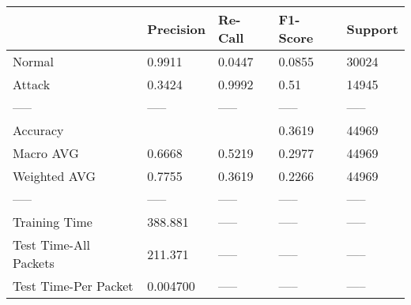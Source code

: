 \begin{tabular}{lllll}
\toprule
{} & Precision & Re-Call & F1-Score & Support \\
\midrule
Normal                &    0.9911 &  0.0447 &   0.0855 &   30024 \\
Attack                &    0.3424 &  0.9992 &     0.51 &   14945 \\
-----                 &     ----- &   ----- &    ----- &   ----- \\
Accuracy              &           &         &   0.3619 &   44969 \\
Macro AVG             &    0.6668 &  0.5219 &   0.2977 &   44969 \\
Weighted AVG          &    0.7755 &  0.3619 &   0.2266 &   44969 \\
-----                 &     ----- &   ----- &    ----- &   ----- \\
Training Time         &   388.881 &   ----- &    ----- &   ----- \\
Test Time-All Packets &   211.371 &   ----- &    ----- &   ----- \\
Test Time-Per Packet  &  0.004700 &   ----- &    ----- &   ----- \\
\bottomrule
\end{tabular}

